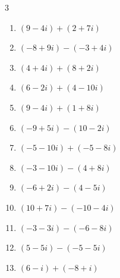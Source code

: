 \begin{multicols}{3}
\begin{enumerate}
        \phantom{$\displaystyle =-5-7i$}

\columnbreak %

  \item $\displaystyle (9-4i) + (2+7i)$

        \phantom{$\displaystyle =11+3i$}

  \item $\displaystyle (-8+9i) - (-3+4i)$

        \phantom{$\displaystyle =-5+5i$}

  \item $\displaystyle (4+4i) + (8+2i)$

        \phantom{$\displaystyle =12+6i$}

  \item $\displaystyle (6-2i) + (4-10i)$

        \phantom{$\displaystyle =10-12i$}

  \item $\displaystyle (9-4i) + (1+8i)$

        \phantom{$\displaystyle =10+4i$}

  \item $\displaystyle (-9+5i) - (10-2i)$

        \phantom{$\displaystyle =-19+7i$}

  \item $\displaystyle (-5-10i) + (-5-8i)$

        \phantom{$\displaystyle =-10-18i$}

  \item $\displaystyle (-3-10i) - (4+8i)$

        \phantom{$\displaystyle =-7-18i$}

  \item $\displaystyle (-6+2i) - (4-5i)$

        \phantom{$\displaystyle =-10+7i$}

  \item $\displaystyle (10+7i) - (-10-4i)$

        \phantom{$\displaystyle =20+11i$}

  \item $\displaystyle (-3-3i) - (-6-8i)$

        \phantom{$\displaystyle =3+5i$}

  \item $\displaystyle (5-5i) - (-5-5i)$

        \phantom{$\displaystyle =10$}

  \item $\displaystyle (6-i) + (-8+i)$


\end{enumerate}
\end{multicols}

